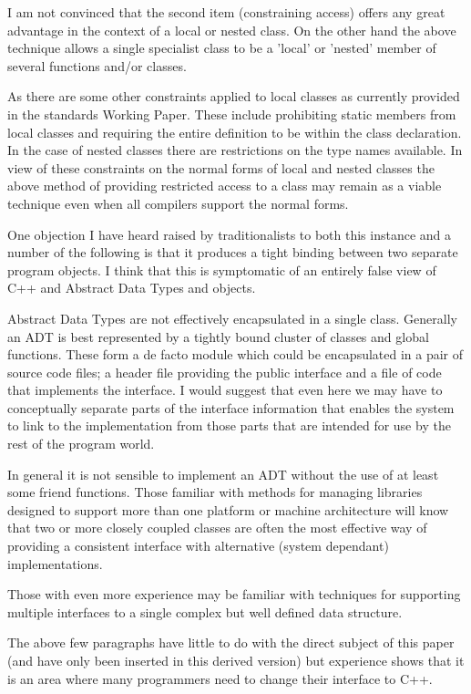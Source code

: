 \documentclass{book}
\begin{document}
I am not convinced that the second item (constraining access) offers any great advantage in the context of a local or nested class.
On the other hand the above technique allows a single specialist class to be a 'local' or 'nested' member of several functions and/or classes.

As there are some other constraints applied to local classes as currently provided in the standards Working Paper. 
These include prohibiting static members from local classes and requiring the entire definition to be within the class declaration.
In the case of nested classes there are restrictions on the type names available. 
In view of these constraints on the normal forms of local and nested classes the above method of providing restricted access to a class may remain as a viable technique even 
when all compilers support the normal forms.

One objection I have heard raised by traditionalists to both this instance and a number of the following is that it produces a tight binding between two separate program objects.
I think that this is symptomatic of an entirely false view of C++ and Abstract Data Types and objects.

Abstract Data Types are not effectively encapsulated in a single class. Generally an ADT is best represented by a tightly bound cluster of classes and global functions.
These form a de facto module which could be encapsulated in a pair of source code files; a header file providing the public interface and a file of code that implements the interface.
I would suggest that even here we may have to conceptually separate parts of the interface information that 
enables the system to link to the implementation from those parts that are intended for use by the rest of the program world.

In general it is not sensible to implement an ADT without the use of at least some friend functions.
Those familiar with methods for managing libraries designed to support more than one platform or machine architecture will know that 
two or more closely coupled classes are often the most effective way of providing a consistent interface with alternative (system dependant) implementations.

Those with even more experience may be familiar with techniques for supporting multiple interfaces to a single complex but well defined data structure.

The above few paragraphs have little to do with the direct subject of this paper (and have only been inserted in this derived version) but 
experience shows that it is an area where many programmers need to change their interface to C++.
\end{document}
